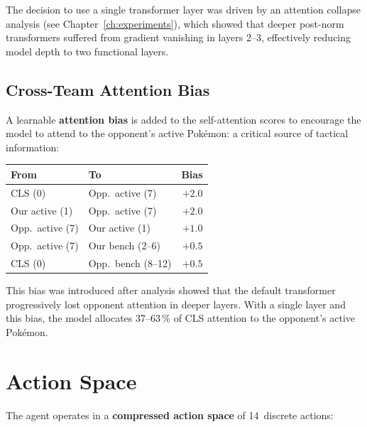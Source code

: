 The decision to use a single transformer layer was driven by an attention
collapse analysis (see Chapter~\ref{ch:experiments}), which showed that deeper
post-norm transformers suffered from gradient vanishing in layers 2--3,
effectively reducing model depth to two functional layers.

\subsection{Cross-Team Attention Bias}

A learnable \textbf{attention bias} is added to the self-attention scores to
encourage the model to attend to the opponent's active Pok\'{e}mon: a
critical source of tactical information:

\begin{center}
\small
\begin{tabularx}{0.7\textwidth}{l l r}
  \toprule
  \textbf{From} & \textbf{To} & \textbf{Bias} \\
  \midrule
  CLS (0)         & Opp.\ active (7)  & $+2.0$ \\
  Our active (1)  & Opp.\ active (7)  & $+2.0$ \\
  Opp.\ active (7) & Our active (1)   & $+1.0$ \\
  Opp.\ active (7) & Our bench (2--6) & $+0.5$ \\
  CLS (0)         & Opp.\ bench (8--12) & $+0.5$ \\
  \bottomrule
\end{tabularx}
\end{center}

This bias was introduced after analysis showed that the default transformer
progressively lost opponent attention in deeper layers.  With a single layer
and this bias, the model allocates 37--63\,\% of CLS attention to the
opponent's active Pok\'{e}mon.


\section{Action Space}
\label{sec:action_space}

The agent operates in a \textbf{compressed action space} of 14~discrete
actions:

